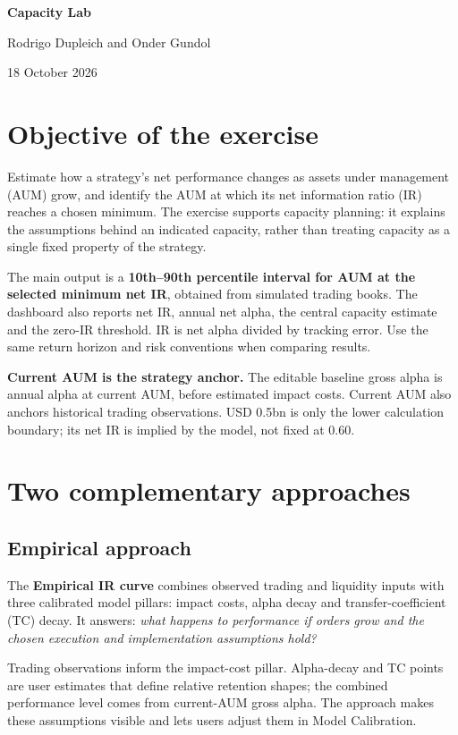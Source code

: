 \documentclass[11pt,a4paper]{article}
\begin{document}
\begin{center}
{\LARGE\bfseries Capacity Lab\par}
{\small Rodrigo Dupleich and Onder Gundol\par}
18 October 2026
\end{center}

\section{Objective of the exercise}
Estimate how a strategy's net performance changes as assets under management (AUM) grow, and identify the AUM at which its net information ratio (IR) reaches a chosen minimum. The exercise supports capacity planning: it explains the assumptions behind an indicated capacity, rather than treating capacity as a single fixed property of the strategy.

The main output is a \textbf{10th--90th percentile interval for AUM at the selected minimum net IR}, obtained from simulated trading books. The dashboard also reports net IR, annual net alpha, the central capacity estimate and the zero-IR threshold. IR is net alpha divided by tracking error. Use the same return horizon and risk conventions when comparing results.

\textbf{Current AUM is the strategy anchor.} The editable baseline gross alpha is annual alpha at current AUM, before estimated impact costs. Current AUM also anchors historical trading observations. USD 0.5bn is only the lower calculation boundary; its net IR is implied by the model, not fixed at 0.60.

\section{Two complementary approaches}
\subsection{Empirical approach}
The \textbf{Empirical IR curve} combines observed trading and liquidity inputs with three calibrated model pillars: impact costs, alpha decay and transfer-coefficient (TC) decay. It answers: \emph{what happens to performance if orders grow and the chosen execution and implementation assumptions hold?}

Trading observations inform the impact-cost pillar. Alpha-decay and TC points are user estimates that define relative retention shapes; the combined performance level comes from current-AUM gross alpha. The approach makes these assumptions visible and lets users adjust them in Model Calibration.
\end{document}
